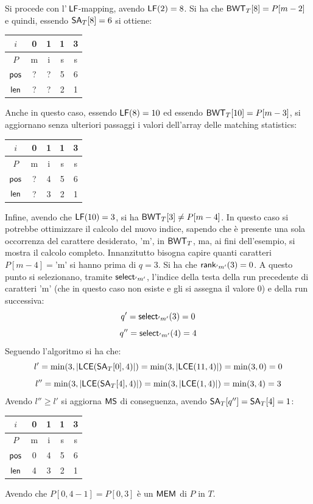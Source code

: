 \begin{esempio}
\begin{table}[H]
\begin{tabular}{c||c|c|c|c}
    \end{tabular}
  \end{table}
  Si procede con l'$\,\mbox{\rm {\sf LF}}$-mapping, avendo $\mbox{\rm {\sf LF}}(2)=8$. Si ha che
  $\mbox{\rm {\sf BWT}}_T[8]=P[m-2]$ e quindi, essendo $\mbox{\rm {\sf SA}}_T[8]=6$ si ottiene:
  \begin{table}[H]
    \centering
    \begin{tabular}{c||c|c|c|c}
      $i$ & 0 & 1 & 1 & 3 \\
      \hline
      $P$ & m & i & s & s \\
      \hline
      \hline
      $\mbox{\rm {\sf pos}}$ & ? & ? & 5 & 6\\
      \hline
      $\mbox{\rm {\sf len}}$& ? & ? & 2 & 1\\
    \end{tabular}
  \end{table}
  Anche in questo caso, essendo $\mbox{\rm {\sf LF}}(8)=10$ ed essendo $\mbox{\rm {\sf BWT}}_T[10]=P[m-3]$, si
  aggiornano senza ulteriori passaggi i valori dell'array delle matching
  statistics: 
  \begin{table}[H]
    \centering
    \begin{tabular}{c||c|c|c|c}
      $i$ & 0 & 1 & 1 & 3 \\
      \hline
      $P$ & m & i & s & s \\
      \hline
      \hline
      $\mbox{\rm {\sf pos}}$ & ? & 4 & 5 & 6\\
      \hline
      $\mbox{\rm {\sf len}}$ & ? & 3 & 2 & 1\\
    \end{tabular}
  \end{table}
  Infine, avendo che $\mbox{\rm {\sf LF}}(10)=3$, si ha $\mbox{\rm {\sf BWT}}_T[3]\neq P[m-4]$. In questo caso si
  potrebbe ottimizzare il calcolo del nuovo indice, sapendo che è presente una
  sola occorrenza del carattere desiderato, $\mbox{'m'}$, in $\mbox{\rm {\sf BWT}}_T$, ma, ai
  fini dell'esempio, si mostra il calcolo completo. Innanzitutto bisogna capire
  quanti caratteri $P[m-4]=\mbox{'m'}$ si hanno prima di $q=3$. Si ha che
  $\mbox{\rm {\sf rank}}_{'m'}(3)=0$. A questo punto si selezionano, tramite $\mbox{\rm {\sf select}}_{'m'}$,
  l'indice della
  testa della run precedente di caratteri $\mbox{'m'}$ (che in questo caso non
  esiste e gli si assegna il valore 0) e della run successiva:
  \[q'=\mbox{\rm {\sf select}}_{'m'}(3)=0\]
  \[q''=\mbox{\rm {\sf select}}_{'m'}(4)=4\]
  Seguendo l'algoritmo si ha che:
  \[l'=\min(3,\left|\mbox{\rm {\sf LCE}}(\mbox{\rm {\sf SA}}_T[0],4)\right|)=\min(3,\left|\mbox{\rm {\sf LCE}}(11,4)\right|)
    =\min(3,0)=0\]
  \[l''=\min(3,\left|\mbox{\rm {\sf LCE}}(\mbox{\rm {\sf SA}}_T[4],4)\right|)=\min(3,\left|\mbox{\rm {\sf LCE}}(1,4)\right|)
    =\min(3,4)=3\]
  Avendo $l''\geq l'$ si aggiorna $\mbox{\rm {\sf MS}}$ di conseguenza, avendo
  $\mbox{\rm {\sf SA}}_T[q'']=\mbox{\rm {\sf SA}}_T[4]=1$: 
  \begin{table}[H]
    \centering
    \begin{tabular}{c||c|c|c|c}
      $i$ & 0 & 1 & 1 & 3 \\
      \hline
      $P$ & m & i & s & s \\
      \hline
      \hline
      $\mbox{\rm {\sf pos}}$ & 0 & 4 & 5 & 6\\
      \hline
      $\mbox{\rm {\sf len}}$ & 4 & 3 & 2 & 1\\
    \end{tabular}
  \end{table}
  Avendo che $P[0,4-1]=P[0,3]$ è un $\mbox{\rm {\sf MEM}}$ di $P$ in $T$. 
\end{esempio}
